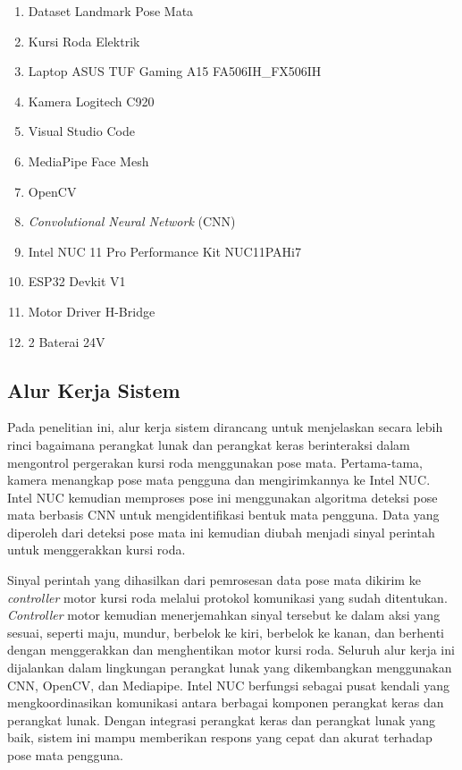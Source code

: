 \begin{enumerate}[itemsep=0cm] 
    \item Dataset Landmark Pose Mata
    \item Kursi Roda Elektrik
    \item Laptop ASUS TUF Gaming A15 FA506IH\_FX506IH
    \item Kamera Logitech C920
    \item Visual Studio Code
    \item MediaPipe Face Mesh
    \item OpenCV
    \item \textit{Convolutional Neural Network} (CNN)
    \item Intel NUC 11 Pro Performance Kit NUC11PAHi7
    \item ESP32 Devkit V1
    \item Motor Driver H-Bridge
    \item 2 Baterai 24V

\end{enumerate}

\subsection{Alur Kerja Sistem}
\label{sec:alur kerja}

Pada penelitian ini, alur kerja sistem dirancang untuk menjelaskan secara lebih rinci bagaimana perangkat lunak dan perangkat keras berinteraksi dalam mengontrol pergerakan kursi roda menggunakan pose mata. Pertama-tama, kamera menangkap pose mata pengguna dan mengirimkannya ke Intel NUC. Intel NUC kemudian memproses pose ini menggunakan algoritma deteksi pose mata berbasis CNN untuk mengidentifikasi bentuk mata pengguna. Data yang diperoleh dari deteksi pose mata ini kemudian diubah menjadi sinyal perintah untuk menggerakkan kursi roda.

Sinyal perintah yang dihasilkan dari pemrosesan data pose mata dikirim ke \emph{controller} motor kursi roda melalui protokol komunikasi yang sudah ditentukan. \emph{Controller} motor kemudian menerjemahkan sinyal tersebut ke dalam aksi yang sesuai, seperti maju, mundur, berbelok ke kiri, berbelok ke kanan, dan berhenti dengan menggerakkan dan menghentikan motor kursi roda. Seluruh alur kerja ini dijalankan dalam lingkungan perangkat lunak yang dikembangkan menggunakan CNN, OpenCV, dan Mediapipe. Intel NUC berfungsi sebagai pusat kendali yang mengkoordinasikan komunikasi antara berbagai komponen perangkat keras dan perangkat lunak. Dengan integrasi perangkat keras dan perangkat lunak yang baik, sistem ini mampu memberikan respons yang cepat dan akurat terhadap pose mata pengguna.


